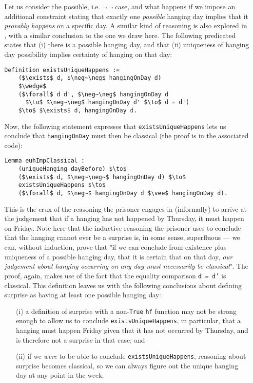 \documentclass[runningheads]{llncs}
\begin{document}
Let us consider the possible, i.e. $\neg~\neg$ case, and
what happens if we impose an additional constraint stating that
exactly one \emph{possible} hanging
day implies that it \emph{provably happens} on a specific day. A similar kind of reasoning is also explored in
\cite{fourpossible}, with a similar conclusion to the one we draw here. The following
predicated states that (i) there is a possible hanging day, and that (ii) uniqueness of hanging day
possibility implies certainty of hanging on that day:

\begin{lstlisting}[mathescape=true]
  Definition existsUniqueHappens :=
    ($\exists$ d, $\neg~\neg$ hangingOnDay d)
    $\wedge$
    ($\forall$ d d', $\neg~\neg$ hangingOnDay d
      $\to$ $\neg~\neg$ hangingOnDay d' $\to$ d = d')
    $\to$ $\exists$ d, hangingOnDay d.
\end{lstlisting}

Now, the following statement expresses that {\tt existsUniqueHappens} lets us
conclude that {\tt hangingOnDay} must then be classical (the proof is in the
associated code):

\begin{lstlisting}[mathescape=true]
  Lemma euhImpClassical :
    (uniqueHanging dayBefore) $\to$
    ($\exists$ d, $\neg~\neg~$ hangingOnDay d) $\to$
    existsUniqueHappens $\to$
    ($\forall$ d, $\neg~$ hangingOnDay d $\vee$ hangingOnDay d).
\end{lstlisting}

This is the crux of the reasoning the prisoner
engages in (informally) to arrive at the judgement that
if a hanging has not happened by Thursday, it must happen on Friday.
Note here that the inductive reasoning the prisoner uses to conclude that the
hanging cannot ever be a surprise is, in some sense, superfluous --- we can,
without induction, prove that "if we can conclude
from existence plus uniqueness of a possible hanging day, that it is certain that on that day,
\emph{our judgement about hanging occurring on any day must necessarily be classical}".
The proof, again, makes use of the fact that the equality comparison {\tt d = d'} is
classical. This definition leaves us with the following conclusions about defining surprise as
having at least one possible hanging day:

\begin{itemize}
  \item[(i)] a definition of surprise with a non-{\tt True} {\tt hf} function
  may not be strong enough to allow us to conclude
  {\tt existsUniqueHappens}, in particular, that a hanging
  must happen Friday given that it has not occurred by Thursday, and is
  therefore not a surprise in that case; and \newline
  \item[(ii)] if we \emph{were} to be able to conclude {\tt existsUniqueHappens},
  reasoning about surprise
  becomes classical, so we can always figure out the unique hanging day at any point in the week.
\end{itemize}
\end{document}
